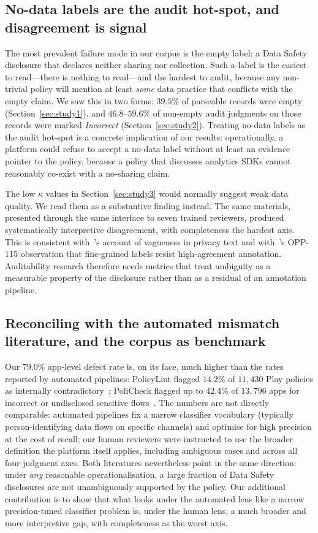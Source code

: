 \documentclass[11pt,a4paper]{article}
\begin{document}
\subsection{No-data labels are the audit hot-spot, and disagreement is signal}
\label{sec:disc-nodata}
The most prevalent failure mode in our corpus is the empty label: a
Data Safety disclosure that declares neither sharing nor collection.
Such a label is the easiest to read---there is nothing to read---and
the hardest to audit, because any non-trivial policy will mention at
least \emph{some} data practice that conflicts with the empty claim.
We saw this in two forms: $39.5\%$ of parseable records were empty
(Section~\ref{sec:study1}), and $46.8$--$59.6\%$ of non-empty audit
judgments on those records were marked \emph{Incorrect}
(Section~\ref{sec:study2}). Treating no-data labels as the audit
hot-spot is a concrete implication of our results: operationally, a
platform could refuse to accept a no-data label without at least an
evidence pointer to the policy, because a policy that discusses
analytics SDKs cannot reasonably co-exist with a no-sharing claim.

The low $\kappa$ values in Section~\ref{sec:study3} would normally
suggest weak data quality. We read them as a substantive finding
instead. The same materials, presented through the same interface to
seven trained reviewers, produced systematically interpretive
disagreement, with completeness the hardest axis. This is consistent
with~\citet{bhatia2016theory}'s account of vagueness in privacy text
and with~\citet{wilson2016creation}'s OPP-115 observation that
fine-grained labels resist high-agreement annotation. Auditability
research therefore needs metrics that treat ambiguity as a measurable
property of the disclosure rather than as a residual of an annotation
pipeline.

\subsection{Reconciling with the automated mismatch literature, and the corpus as benchmark}
\label{sec:disc-reconcile}
Our $79.0\%$ app-level defect rate is, on its face, much higher than
the rates reported by automated pipelines: PolicyLint flagged
$14.2\%$ of $11{,}430$ Play policies as internally
contradictory~\citep{andow2019policylint}; PoliCheck flagged up to
$42.4\%$ of $13{,}796$ apps for incorrect or undisclosed sensitive
flows~\citep{andow2020policheck}. The numbers are not directly
comparable: automated pipelines fix a narrow classifier vocabulary
(typically person-identifying data flows on specific channels) and
optimise for high precision at the cost of recall; our human reviewers
were instructed to use the broader definition the platform itself
applies, including ambiguous cases and across all four judgment axes.
Both literatures nevertheless point in the same direction: under
\emph{any} reasonable operationalisation, a large fraction of Data
Safety disclosures are not unambiguously supported by the policy.
Our additional contribution is to show that what looks under the
automated lens like a narrow precision-tuned classifier problem is,
under the human lens, a much broader and more interpretive gap, with
completeness as the worst axis.
\end{document}
